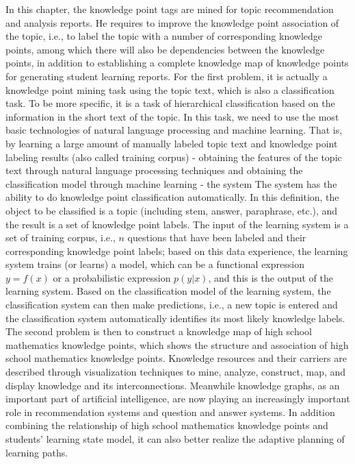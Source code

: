 In this chapter, the knowledge point tags are mined for topic recommendation and analysis reports. He requires to improve the knowledge point association of the topic, i.e., to label the topic with a number of corresponding knowledge points, among which there will also be dependencies between the knowledge points, in addition to establishing a complete knowledge map of knowledge points for generating student learning reports. For the first problem, it is actually a knowledge point mining task using the topic text, which is also a classification task. To be more specific, it is a task of hierarchical classification based on the information in the short text of the topic. In this task, we need to use the most basic technologies of natural language processing and machine learning. That is, by learning a large amount of manually labeled topic text and knowledge point labeling results (also called training corpus) - obtaining the features of the topic text through natural language processing techniques and obtaining the classification model through machine learning - the system The system has the ability to do knowledge point classification automatically. In this definition, the object to be classified is a topic (including stem, answer, paraphrase, etc.), and the result is a set of knowledge point labels. The input of the learning system is a set of training corpus, i.e., $n$ questions that have been labeled and their corresponding knowledge point labels; based on this data experience, the learning system trains (or learns) a model, which can be a functional expression $y=f(x)$ or a probabilistic expression $p(y|x)$, and this is the output of the learning system. Based on the classification model of the learning system, the classification system can then make predictions, i.e., a new topic is entered and the classification system automatically identifies its most likely knowledge labels. The second problem is then to construct a knowledge map of high school mathematics knowledge points, which shows the structure and association of high school mathematics knowledge points. Knowledge resources and their carriers are described through visualization techniques to mine, analyze, construct, map, and display knowledge and its interconnections. Meanwhile knowledge graphs, as an important part of artificial intelligence, are now playing an increasingly important role in recommendation systems and question and answer systems. In addition combining the relationship of high school mathematics knowledge points and students' learning state model, it can also better realize the adaptive planning of learning paths.


